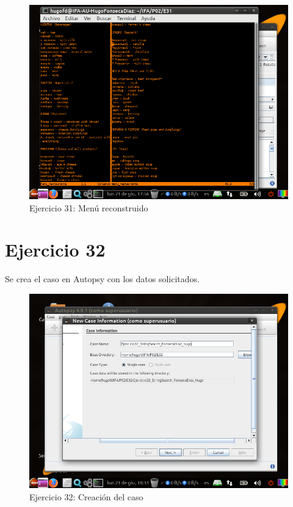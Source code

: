 \documentclass[11pt]{article}
\begin{document}
\begin{figure}[H]
    \caption{Ejercicio 31: Menú reconstruido}
  \centering
  \includegraphics[scale=0.7]{e31-7.png}
\end{figure}

\section{Ejercicio 32}
Se crea el caso en Autopsy con los datos solicitados.

\begin{figure}[H]
    \caption{Ejercicio 32: Creación del caso}
  \centering
  \includegraphics[scale=0.7]{e32-1.png}
\end{figure}
\end{document}
